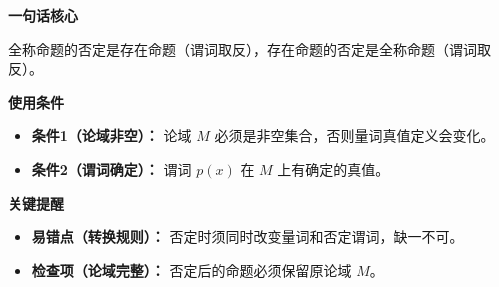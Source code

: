\begin{summarybox}
	\textbf{\textcolor{CSummary}{一句话核心}}

	全称命题的否定是存在命题（谓词取反），存在命题的否定是全称命题（谓词取反）。

	\medskip
	\textbf{\textcolor{CSummary}{使用条件}}
	\begin{itemize}[leftmargin=*, itemsep=0.5em, topsep=0.4em]
		\item \textbf{条件1（论域非空）：} 论域 $M$ 必须是非空集合，否则量词真值定义会变化。
		\item \textbf{条件2（谓词确定）：} 谓词 $p(x)$ 在 $M$ 上有确定的真值。
	\end{itemize}

	\medskip
	\textbf{\textcolor{CSummary}{关键提醒}}
	\begin{itemize}[leftmargin=*, itemsep=0.5em, topsep=0.4em]
		\item \textbf{易错点（转换规则）：} 否定时须同时改变量词和否定谓词，缺一不可。
		\item \textbf{检查项（论域完整）：} 否定后的命题必须保留原论域 $M$。
	\end{itemize}
\end{summarybox}
